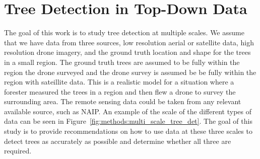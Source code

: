 %
%

\section{Tree Detection in Top-Down Data}
The goal of this work is to study tree detection at multiple scales. We assume that we have data from three sources, low resolution aerial or satellite data, high resolution drone imagery, and the ground truth location and shape for the trees in a small region. The ground truth trees are assumed to be fully within the region the drone surveyed and the drone survey is assumed be be fully within the region with sateillite data. This is a realistic model for a situation where a forester measured the trees in a region and then flew a drone to survey the surrounding area. The remote sensing data could be taken from any relevant available source, such as NAIP. An example of the scale of the different types of data can be seen in Figure~\ref{fig:methods:multi_scale_tree_det}. The goal of this study is to provide recommendations on how to use data at these three scales to detect trees as accurately as possible and determine whether all three are required. 


